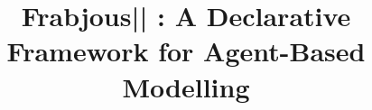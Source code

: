 \documentclass{sig-alternate}
\begin{document}
%

\title{Frabjous|| : A Declarative Framework for Agent-Based Modelling}
%
%
%
%
%
\end{document}
